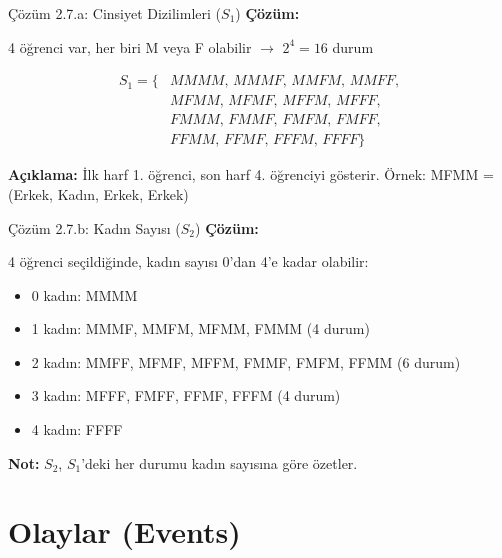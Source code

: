 \documentclass[light]{lutbeamer}
\begin{document}
\begin{frame}{Çözüm 2.7.a: Cinsiyet Dizilimleri ($S_1$)}
    \color{blue}
    \textbf{Çözüm:}
    
    4 öğrenci var, her biri M veya F olabilir $\rightarrow$ $2^4 = 16$ durum
    
    \footnotesize
    \begin{align*}
    S_1 = \{ &MMMM, \, MMMF, \, MMFM, \, MMFF, \\
             &MFMM, \, MFMF, \, MFFM, \, MFFF, \\
             &FMMM, \, FMMF, \, FMFM, \, FMFF, \\
             &FFMM, \, FFMF, \, FFFM, \, FFFF \}
    \end{align*}
    
    \textbf{Açıklama:} İlk harf 1. öğrenci, son harf 4. öğrenciyi gösterir.
    Örnek: MFMM = (Erkek, Kadın, Erkek, Erkek)
\end{frame}

\begin{frame}{Çözüm 2.7.b: Kadın Sayısı ($S_2$)}
    \color{blue}
    \textbf{Çözüm:}
    
    4 öğrenci seçildiğinde, kadın sayısı 0'dan 4'e kadar olabilir:
    
    \begin{itemize}
        \item 0 kadın: MMMM
        \item 1 kadın: MMMF, MMFM, MFMM, FMMM (4 durum)
        \item 2 kadın: MMFF, MFMF, MFFM, FMMF, FMFM, FFMM (6 durum)
        \item 3 kadın: MFFF, FMFF, FFMF, FFFM (4 durum)
        \item 4 kadın: FFFF
    \end{itemize}
    
    \vspace{0.5cm}
    \begin{center}
    \end{center}
    
    \textbf{Not:} $S_2$, $S_1$'deki her durumu kadın sayısına göre özetler.
\end{frame}

\section{Olaylar (Events)}
\end{document}
